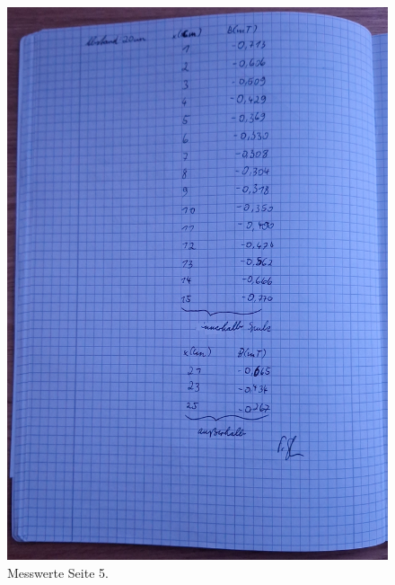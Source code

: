 \begin{figure}
    \caption{Messwerte Seite 5.}
    \centering
    \includegraphics[width=\textwidth]{"Bilder/mw3.jpeg"}
\end{figure}
